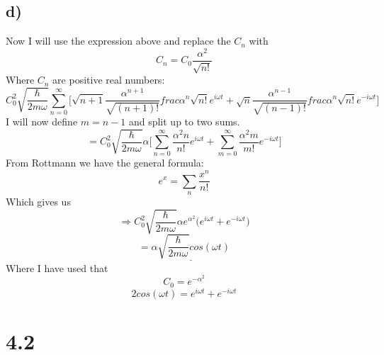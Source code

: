 \documentclass{scrartcl}
\begin{document}
\subsection*{d)}
Now I will use the expression above and replace the $C_n$ with
\begin{equation}
C_n=C_0\frac{\alpha^2}{\sqrt{n!}}
\end{equation}
Where $C_n$ are positive real numbers:
\begin{equation}
C_0^2\sqrt{\frac{\hbar}{2m\omega}}\sum_{n=0}^\infty \bigg[\sqrt{n+1}\frac{\alpha^{n+1}}{\sqrt{(n+1)!}}frac{\alpha^n}{\sqrt{n!}}e^{i\omega t}+\sqrt{n}\frac{\alpha^{n-1}}{\sqrt{(n-1)!}}frac{\alpha^n}{\sqrt{n!}}e^{-i\omega t}\bigg]
\end{equation}
I will now define $m=n-1$ and split up to two sums.
$$=C_0^2\sqrt{\frac{\hbar}{2m\omega}}\alpha\bigg[\sum_{n=0}^\infty \frac{\alpha^2n}{n!}e^{i\omega t}+\sum_{m=0}^\infty \frac{\alpha^2m}{m!}e^{-i\omega t}\bigg]$$
From Rottmann we have the general formula:
\begin{equation}
e^x=\sum_n \frac{x^n}{n!}
\end{equation}
Which gives us
$$\Rightarrow C_0^2 \sqrt{\frac{\hbar}{2m\omega}}\alpha e^{\alpha^2}\bigg(e^{i\omega t}+e^{-i\omega t}\bigg)$$
\begin{equation}
=\underline{\alpha \sqrt{\frac{\hbar}{2m\omega}} cos(\omega t)}
\end{equation}
Where I have used that
\begin{equation}
C_0=e^{-\alpha^2}
\end{equation}
\begin{equation}
2cos(\omega t)=e^{i\omega t}+e^{-i\omega t}
\end{equation}

\section*{4.2}
\end{document}
